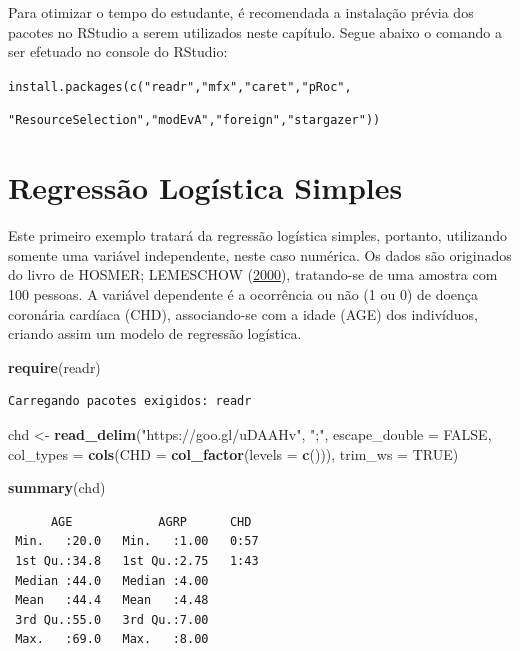 \documentclass[12pt,brazil,oneside]{book}
\newenvironment{Shaded}{\begin{snugshade}}{\end{snugshade}}
\newcommand{\DataTypeTok}[1]{\textcolor[rgb]{0.13,0.29,0.53}{#1}}
\newcommand{\KeywordTok}[1]{\textcolor[rgb]{0.13,0.29,0.53}{\textbf{#1}}}
\newcommand{\NormalTok}[1]{#1}
\newcommand{\OtherTok}[1]{\textcolor[rgb]{0.56,0.35,0.01}{#1}}
\newcommand{\StringTok}[1]{\textcolor[rgb]{0.31,0.60,0.02}{#1}}
\begin{document}
Para otimizar o tempo do estudante, é recomendada a instalação prévia
dos pacotes no RStudio a serem utilizados neste capítulo. Segue abaixo o
comando a ser efetuado no console do RStudio:

\texttt{install.packages(c("readr","mfx","caret","pRoc",}

\texttt{"ResourceSelection","modEvA","foreign","stargazer"))}

\hypertarget{regressao-logistica-simples}{%
\section{Regressão Logística
Simples}\label{regressao-logistica-simples}}

Este primeiro exemplo tratará da regressão logística simples, portanto,
utilizando somente uma variável independente, neste caso numérica. Os
dados são originados do livro de HOSMER; LEMESCHOW
(\protect\hyperlink{ref-Hosmer2000}{2000}), tratando-se de uma amostra
com 100 pessoas. A variável dependente é a ocorrência ou não (1 ou 0) de
doença coronária cardíaca (CHD), associando-se com a idade (AGE) dos
indivíduos, criando assim um modelo de regressão logística.

\begin{Shaded}
\begin{Highlighting}[]
\KeywordTok{require}\NormalTok{(readr)}
\end{Highlighting}
\end{Shaded}

\begin{verbatim}
Carregando pacotes exigidos: readr
\end{verbatim}

\begin{Shaded}
\begin{Highlighting}[]
\NormalTok{chd <-}\StringTok{ }\KeywordTok{read_delim}\NormalTok{(}\StringTok{"https://goo.gl/uDAAHv"}\NormalTok{, }
    \StringTok{";"}\NormalTok{, }\DataTypeTok{escape_double =} \OtherTok{FALSE}\NormalTok{, }\DataTypeTok{col_types =} \KeywordTok{cols}\NormalTok{(}\DataTypeTok{CHD =} \KeywordTok{col_factor}\NormalTok{(}\DataTypeTok{levels =} \KeywordTok{c}\NormalTok{())), }
    \DataTypeTok{trim_ws =} \OtherTok{TRUE}\NormalTok{)}

\KeywordTok{summary}\NormalTok{(chd)}
\end{Highlighting}
\end{Shaded}

\begin{verbatim}
      AGE            AGRP      CHD   
 Min.   :20.0   Min.   :1.00   0:57  
 1st Qu.:34.8   1st Qu.:2.75   1:43  
 Median :44.0   Median :4.00         
 Mean   :44.4   Mean   :4.48         
 3rd Qu.:55.0   3rd Qu.:7.00         
 Max.   :69.0   Max.   :8.00         
\end{verbatim}
\end{document}
